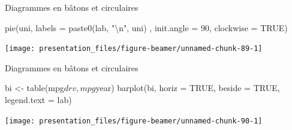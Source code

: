 \documentclass[12pt,ignorenonframetext,handout,]{beamer}
\newenvironment{Shaded}{}{}
\newcommand{\CharTok}[1]{\textcolor[rgb]{0.00,0.50,0.50}{#1}}
\newcommand{\DataTypeTok}[1]{#1}
\newcommand{\DecValTok}[1]{#1}
\newcommand{\KeywordTok}[1]{\textcolor[rgb]{0.00,0.00,1.00}{#1}}
\newcommand{\NormalTok}[1]{#1}
\newcommand{\OperatorTok}[1]{#1}
\newcommand{\OtherTok}[1]{\textcolor[rgb]{1.00,0.25,0.00}{#1}}
\newcommand{\StringTok}[1]{\textcolor[rgb]{0.00,0.50,0.50}{#1}}
\renewenvironment{Shaded}{\begin{snugshade}}{\end{snugshade}}
\begin{document}
\begin{frame}[fragile]{Diagrammes en bâtons et circulaires}
\protect\hypertarget{diagrammes-en-batons-et-circulaires-2}{}

\centering \footnotesize

\begin{Shaded}
\begin{Highlighting}[]
\KeywordTok{pie}\NormalTok{(uni, }\DataTypeTok{labels =} \KeywordTok{paste0}\NormalTok{(lab, }\StringTok{"}\CharTok{\textbackslash{}n}\StringTok{"}\NormalTok{, uni)}
\NormalTok{    , }\DataTypeTok{init.angle =} \DecValTok{90}\NormalTok{, }\DataTypeTok{clockwise =} \OtherTok{TRUE}\NormalTok{)}
\end{Highlighting}
\end{Shaded}

\texttt{[image: presentation\_files/figure-beamer/unnamed-chunk-89-1]}

\end{frame}

\begin{frame}[fragile]{Diagrammes en bâtons et circulaires}
\protect\hypertarget{diagrammes-en-batons-et-circulaires-3}{}

\centering \footnotesize

\begin{Shaded}
\begin{Highlighting}[]
\NormalTok{bi <-}\StringTok{ }\KeywordTok{table}\NormalTok{(mpg}\OperatorTok{$}\NormalTok{drv, mpg}\OperatorTok{$}\NormalTok{year)}
\KeywordTok{barplot}\NormalTok{(bi, }\DataTypeTok{horiz =} \OtherTok{TRUE}\NormalTok{, }\DataTypeTok{beside =} \OtherTok{TRUE}\NormalTok{, }\DataTypeTok{legend.text =}\NormalTok{ lab)}
\end{Highlighting}
\end{Shaded}

\texttt{[image: presentation\_files/figure-beamer/unnamed-chunk-90-1]}

\end{frame}
\end{document}
